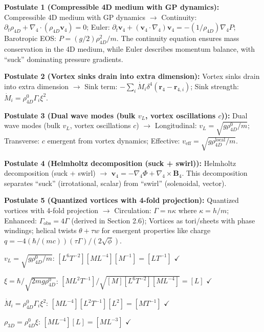 \begin{tcolorbox}
\textbf{Postulate 1 (Compressible 4D medium with GP dynamics):} Compressible 4D medium with GP dynamics $\to$ Continuity: $\partial_t \rho_{4D} + \nabla_4 \cdot (\rho_{4D} \mathbf{v}_4) = 0$; Euler: $\partial_t \mathbf{v}_4 + (\mathbf{v}_4 \cdot \nabla_4) \mathbf{v}_4 = -(1/\rho_{4D}) \nabla_4 P$; Barotropic EOS: $P = (g/2) \rho_{4D}^2 / m$. The continuity equation ensures mass conservation in the 4D medium, while Euler describes momentum balance, with ``suck'' dominating pressure gradients.

\textbf{Postulate 2 (Vortex sinks drain into extra dimension):} Vortex sinks drain into extra dimension $\to$ Sink term: $-\sum_i \dot{M}_i \delta^4(\mathbf{r}_4 - \mathbf{r}_{4,i})$; Sink strength: $\dot{M}_i = \rho_{4D}^0 \Gamma_i \xi^2$.

\textbf{Postulate 3 (Dual wave modes (bulk $v_L$, vortex oscillations $c$)):} Dual wave modes (bulk $v_L$, vortex oscillations $c$) $\to$ Longitudinal: $v_L = \sqrt{g \rho_{4D}^0 / m}$; Transverse: $c$ emergent from vortex dynamics; Effective: $v_{\text{eff}} = \sqrt{g \rho_{4D}^{\text{local}} / m}$.

\textbf{Postulate 4 (Helmholtz decomposition (suck + swirl)):} Helmholtz decomposition (suck + swirl) $\to$ $\mathbf{v}_4 = -\nabla_4 \Phi + \nabla_4 \times \mathbf{B}_4$. This decomposition separates ``suck'' (irrotational, scalar) from ``swirl'' (solenoidal, vector).

\textbf{Postulate 5 (Quantized vortices with 4-fold projection):} Quantized vortices with 4-fold projection $\to$ Circulation: $\Gamma = n \kappa$ where $\kappa = h / m$; Enhanced: $\Gamma_{\text{obs}} = 4 \Gamma$ (derived in Section 2.6); Vortices as tori/sheets with phase windings; helical twists $\theta + \tau w$ for emergent properties like charge $q = -4 (\hbar / (m c)) (\tau \Gamma) / (2 \sqrt{\phi})$.
\end{tcolorbox}

\begin{tcolorbox}[title=Dimensional Check]
$v_L = \sqrt{g \rho_{4D}^0 / m}$: $[L^6 T^{-2}] [M L^{-4}] [M^{-1}] = [L T^{-1}]$ $\checkmark$

$\xi = \hbar / \sqrt{2 m g \rho_{4D}^0}$: $[M L^2 T^{-1}] / \sqrt{[M] [L^6 T^{-2}] [M L^{-4}]} = [L]$ $\checkmark$

$\dot{M}_i = \rho_{4D}^0 \Gamma_i \xi^2$: $[M L^{-4}] [L^2 T^{-1}] [L^2] = [M T^{-1}]$ $\checkmark$

$\rho_{3D} = \rho_{4D}^0 \xi$: $[M L^{-4}] [L] = [M L^{-3}]$ $\checkmark$
\end{tcolorbox}

